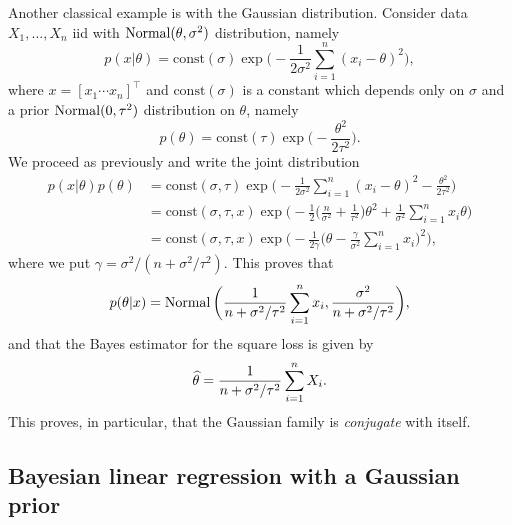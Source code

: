 Another classical example is with the Gaussian distribution.
Consider data $X_1, \ldots, X_n$ iid with $\operatorname{Normal}(\theta, \sigma^2)$ distribution, namely
\begin{equation*}
	p(x | \theta) = \text{const}(\sigma) \exp\Big( - \frac{1}{2 \sigma^2} \sum_{i=1}^n 
	(x_i - \theta)^2 \Big),
\end{equation*}
where $x = [x_1 \cdots x_n]^\top$ and $\text{const}(\sigma)$ is a constant which depends only on $\sigma$ and a prior $\operatorname{Normal}(0, \tau^2)$ distribution on $\theta$, namely
\begin{equation*}
	p(\theta) = \text{const}(\tau) \exp\Big(-\frac{\theta^2}{2 \tau^2} \Big).
\end{equation*}
We proceed as previously and write the joint distribution
\begin{align*}
	p(x | \theta) p(\theta) &= \text{const}(\sigma, \tau) \exp\Big( - \frac{1}{2 \sigma^2} 
	\sum_{i=1}^n (x_i - \theta)^2 - \frac{\theta^2}{2 \tau^2} \Big) \\
	&= \text{const}(\sigma, \tau, x) \exp \bigg ( - \frac 12 \Big( \frac{n}{\sigma^2} + \frac{1}{\tau^2} \Big) \theta^2 + \frac{1}{\sigma^2} \sum_{i=1}^n x_i \theta  \bigg) \\
	&= \text{const}(\sigma, \tau, x) \exp \bigg( - \frac{1}{2 \gamma} \Big(\theta - \frac{\gamma}{\sigma^2} \sum_{i=1}^n x_i \Big)^2 \bigg),
\end{align*}
where we put $\gamma = \sigma^2 / (n + \sigma^2 / \tau^2)$.
This proves that
\begin{equation*}
	p(\theta | x) = \operatorname{Normal} \bigg( \frac{1}{n + \sigma^2 / \tau^2} \sum_{i=1}^n x_i, \frac{\sigma^2}{n + \sigma^2 / \tau^2} \bigg),
\end{equation*}
and that the Bayes estimator for the square loss is given by
\begin{equation*}
	\widehat \theta = \frac{1}{n + \sigma^2 / \tau^2} \sum_{i=1}^n X_i.
\end{equation*}
This proves, in particular, that the Gaussian family is \emph{conjugate} with itself.


\subsection{Bayesian linear regression with a Gaussian prior} %
\label{sub:bayesian-linear-regression}

